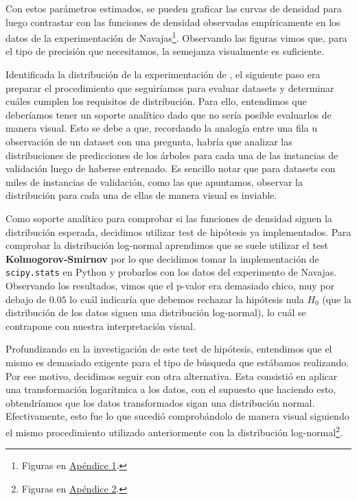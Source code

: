 Con estos parámetros estimados, se pueden graficar las curvas de densidad para luego contrastar con las funciones de densidad observadas empíricamente en los datos de la experimentación de Navajas\footnote{Figuras en \hyperref[appendix1]{Apéndice 1}.}. Observando las figuras vimos que, para el tipo de precisión que necesitamos, la semejanza visualmente es suficiente.

Identificada la distribución de la experimentación de \cite{navajasAggregatedKnowledge}, el siguiente paso era preparar el procedimiento que seguiríamos para evaluar datasets y determinar cuáles cumplen los requisitos de distribución. Para ello, entendimos que deberíamos tener un soporte analítico dado que no sería posible evaluarlos de manera visual. Esto se debe a que, recordando la analogía entre una fila u observación de un dataset con una pregunta, habría que analizar las distribuciones de predicciones de los árboles para cada una de las instancias de validación luego de haberse entrenado. Es sencillo notar que para datasets con miles de instancias de validación, como las que apuntamos, observar la distribución para cada una de ellas de manera visual es inviable.

Como soporte analítico para comprobar si las funciones de densidad siguen la distribución esperada, decidimos utilizar test de hipótesis ya implementados. Para comprobar la distribución log-normal aprendimos que se suele utilizar el test \textbf{Kolmogorov-Smirnov} por lo que decidimos tomar la implementación de \texttt{scipy.stats} en Python y probarlos con los datos del experimento de Navajas. Observando los resultados, vimos que el p-valor era demasiado chico, muy por debajo de $0.05$ lo cuál indicaría que debemos rechazar la hipótesis nula $H_0$ (que la distribución de los datos siguen una distribución log-normal), lo cuál se contrapone con nuestra interpretación visual. 

Profundizando en la investigación de este test de hipótesis, entendimos que el mismo es demasiado exigente para el tipo de búsqueda que estábamos realizando. Por ese motivo, decidimos seguir con otra alternativa. Esta consistió en aplicar una transformación logarítmica a los datos, con el supuesto que haciendo esto, obtendríamos que los datos transformados sigan una distribución normal. Efectivamente, esto fue lo que sucedió comprobándolo de manera visual siguiendo el mismo procedimiento utilizado anteriormente con la distribución log-normal\footnote{Figuras en \hyperref[appendix2]{Apéndice 2}.}.

